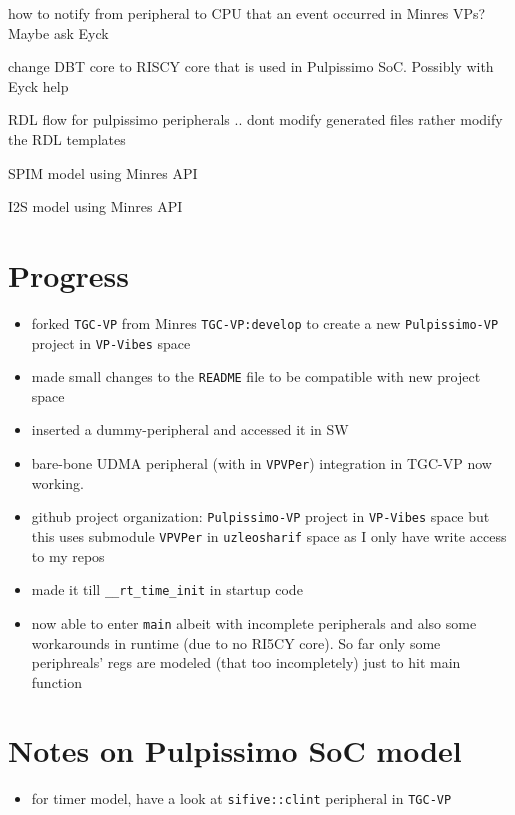 \documentclass{article}
\begin{document}
\begin{todolist}
 \item how to notify from peripheral to CPU that an event occurred in Minres VPs? Maybe ask Eyck
 \item change DBT core to RISCY core that is used in Pulpissimo SoC. Possibly with Eyck help
 \item RDL flow for pulpissimo peripherals .. dont modify generated files rather modify the RDL templates
 \item SPIM model using Minres API
 \item I2S model using Minres API
\end{todolist}

\section{Progress}
\begin{itemize}
 \item forked \texttt{TGC-VP} from Minres \texttt{TGC-VP:develop} to create a new \texttt{Pulpissimo-VP} project in
       \texttt{VP-Vibes} space
 \item made small changes to the \texttt{README} file to be compatible with new project space
 \item inserted a dummy-peripheral and accessed it in SW
 \item bare-bone UDMA peripheral (with in \texttt{VPVPer}) integration in TGC-VP now working.
 \item github project organization: \texttt{Pulpissimo-VP} project in \texttt{VP-Vibes} space but this uses
       submodule \texttt{VPVPer} in \texttt{uzleosharif} space as I only have write access to my repos
 \item made it till \texttt{\_\_rt\_time\_init} in startup code
 \item now able to enter \texttt{main} albeit with incomplete peripherals and also some workarounds in runtime (due to no RI5CY core). So far
       only some periphreals' regs are modeled (that too incompletely) just to hit main function
\end{itemize}

\section{Notes on Pulpissimo SoC model}
\begin{itemize}
 \item for timer model, have a look at \texttt{sifive::clint} peripheral in \texttt{TGC-VP}
\end{itemize}
\end{document}
